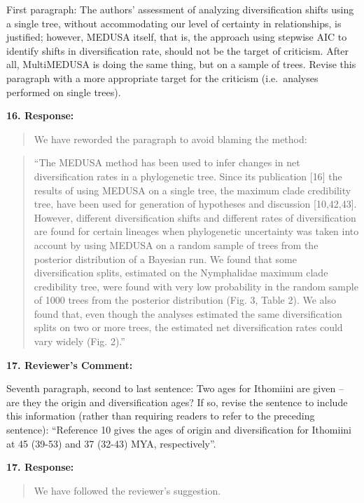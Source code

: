 \documentclass[]{article}
\begin{document}
First paragraph: The authors' assessment of analyzing diversification
shifts using a single tree, without accommodating our level of certainty
in relationships, is justified; however, MEDUSA itself, that is, the
approach using stepwise AIC to identify shifts in diversification rate,
should not be the target of criticism. After all, MultiMEDUSA is doing
the same thing, but on a sample of trees. Revise this paragraph with a
more appropriate target for the criticism (i.e.~analyses performed on
single trees).

\textbf{16. Response:}

\begin{quote}
\color{blue}
We have reworded the paragraph to avoid blaming the method:
\end{quote}

\begin{quote}
\color{blue}
``The MEDUSA method has been used to infer changes in net
diversification rates in a phylogenetic tree. Since its publication
{[}16{]} the results of using MEDUSA on a single tree, the maximum clade
credibility tree, have been used for generation of hypotheses and
discussion {[}10,42,43{]}. However, different diversification shifts and
different rates of diversification are found for certain lineages when
phylogenetic uncertainty was taken into account by using MEDUSA on a
random sample of trees from the posterior distribution of a Bayesian
run. We found that some diversification splits, estimated on the
Nymphalidae maximum clade credibility tree, were found with very low
probability in the random sample of 1000 trees from the posterior
distribution (Fig. 3, Table 2). We also found that, even though the
analyses estimated the same diversification splits on two or more trees,
the estimated net diversification rates could vary widely (Fig. 2).''
\end{quote}

\textbf{17. Reviewer's Comment:}

Seventh paragraph, second to last sentence: Two ages for Ithomiini are
given -- are they the origin and diversification ages? If so, revise the
sentence to include this information (rather than requiring readers to
refer to the preceding sentence): ``Reference 10 gives the ages of
origin and diversification for Ithomiini at 45 (39-53) and 37 (32-43)
MYA, respectively''.

\textbf{17. Response:}

\begin{quote}
\color{blue}
We have followed the reviewer's suggestion.
\end{quote}
\end{document}
